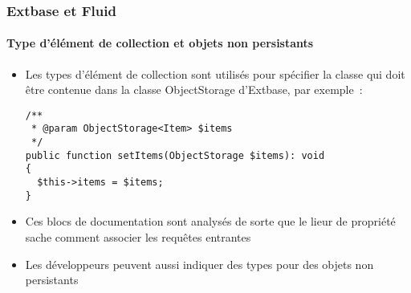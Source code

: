 %

\begin{frame}[fragile]
	\frametitle{Extbase et Fluid}
	\framesubtitle{Type d'élément de collection et objets non persistants}


	\begin{itemize}
		\item Les types d'élément de collection sont utilisés pour spécifier la classe qui doit
			être contenue dans la classe ObjectStorage d'Extbase, par exemple~:
\begin{lstlisting}
/**
 * @param ObjectStorage<Item> $items
 */
public function setItems(ObjectStorage $items): void
{
  $this->items = $items;
}
\end{lstlisting}

		\item Ces blocs de documentation sont analysés de sorte que le lieur de propriété sache
			comment associer les requêtes entrantes
		\item Les développeurs peuvent aussi indiquer des types pour des objets non persistants
	\end{itemize}

\end{frame}

